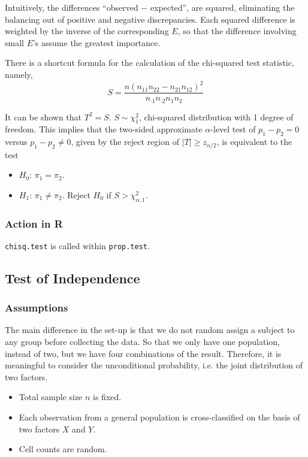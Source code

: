 Intuitively, the differences ``observed $-$ expected'', are squared, eliminating the balancing out of positive and negative discrepancies. Each squared difference is weighted by the inverse of the corresponding $E$, so that the difference involving small $E$'s assume the greatest importance.

There is a shortcut formula for the calculation of the chi-squared test statistic, namely,
\[S = \frac{n(n_{11}n_{22}- n_{21}n_{12})^2}{n_{\cdot 1}n_{\cdot 2}n_1 n_2}\]

It can be shown that $T^2 = S$. $S \sim \chi^2_1$, chi-squared distribution with 1 degree of freedom. This implies that the two-sided approximate $\alpha$-level test of $p_1 - p_2 = 0$ versus $p_1 - p_2 \neq 0$, given by the reject region of $|T| \ge z_{\alpha/2}$, is equivalent to the test 
\begin{itemize}
	\item $H_0$: $\pi_1 = \pi_2$.
	\item $H_1$: $\pi_1 \neq \pi_2$. Reject $H_0$ if $S > \chi^2_{\alpha,1}$.
\end{itemize}
\subsubsection{Action in R}
\texttt{chisq.test} is called within \texttt{prop.test}.


\subsection{Test of Independence}
\subsubsection{Assumptions}
The main difference in the set-up is that we do not random assign a subject to any group before collecting the data. So that we only have one population, instead of two, but we have four combinations of the result. Therefore, it is meaningful to consider the unconditional probability, i.e. the joint distribution of two factors.
\begin{itemize}
	\item Total sample size $n$ is fixed.
	\item Each observation from a general population is cross-classified on the basis of two factors $X$ and $Y$.
	\item Cell counts are random.
\end{itemize}

